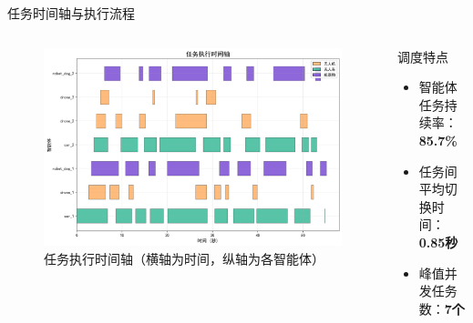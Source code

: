 \documentclass[
10pt,
aspectratio=169,
]{beamer}
\begin{document}

\begin{frame}{任务时间轴与执行流程}
    \begin{columns}
        \begin{column}{0.6\textwidth}
            \begin{figure}
                \centering
                \includegraphics[width=\textwidth]{analysis_results/task_timeline_20250617_081456.png}
                \caption{任务执行时间轴（横轴为时间，纵轴为各智能体）}
            \end{figure}
        \end{column}
        \begin{column}{0.4\textwidth}
            \begin{exampleblock}{调度特点}
                \begin{itemize}
                    \item 智能体任务持续率：\textbf{85.7\%}
                    \item 任务间平均切换时间：\textbf{0.85秒}
                    \item 峰值并发任务数：\textbf{7个}
                \end{itemize}
            \end{exampleblock}
            

\end{column}
\end{columns}
\end{frame}
\end{document}

